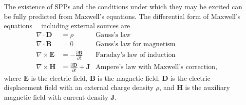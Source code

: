 The existence of SPPs and the conditions under which they may be excited
can be fully predicted from Maxwell's equations.  The differential form of
Maxwell's equations~\cite{maier2007plasmonics}~\cite{benson2009elements}
including external sources are
\begin{align}
\nabla \cdot \mathbf{D} &= \rho & \text{Gauss's law} \label{eqn:gausslaw}\\
\nabla \cdot \mathbf{B} &= 0 & \text{Gauss's law for magnetism} \label{eqn:gausslawmagnetism}\\
\nabla \times \mathbf{E} &= -\frac{\partial \mathbf{B}} {\partial t}
& \text{Faraday's law of induction} \label{eqn:faradayslaw} \\
\nabla \times \mathbf{H} &= \frac{\partial \mathbf{D}} {\partial
t} + \mathbf{J}  & \text{Ampere's law with Maxwell's correction},
\label{eqn:ampereslaw}
\end{align}
where $\mathbf{E}$ is the electric field, $\mathbf{B}$ is the magnetic
field, $\mathbf{D}$ is the electric displacement field with an external
charge density $\rho$, and $\mathbf{H}$ is the auxiliary magnetic field
with current density $\mathbf{J}$.


